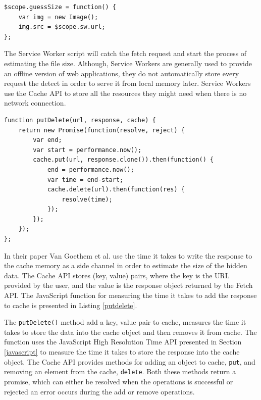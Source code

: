 \documentclass[10pt,a4paper,twoside]{book}
\begin{document}

\begin{lstlisting}[caption={Loading file as an Image},label={SWimg}]
$scope.guessSize = function() {
	var img = new Image();
	img.src = $scope.sw.url;
};
\end{lstlisting}

The Service Worker script will catch the fetch request and start the process of estimating the file size. Although, Service Workers are generally used to provide an offline version of web applications, they do not automatically store every request the detect in order to serve it from local memory later. Service Workers use the Cache API \cite{cacheAPI} to store all the resources they might need when there is no network connection.

\begin{lstlisting}[caption={JavaScript code for measuring the time it takes to write to cache.},label={putdelete}]
function putDelete(url, response, cache) {
    return new Promise(function(resolve, reject) {
        var end;
        var start = performance.now();
        cache.put(url, response.clone()).then(function() {
            end = performance.now();
            var time = end-start;
            cache.delete(url).then(function(res) {
                resolve(time);
            });
        });
    });
};
\end{lstlisting}

In their paper Van Goethem et al. \cite{van2015clock} use the time it takes to write the response to the cache memory as a side channel in order to estimate the size of the hidden data. The Cache API stores (key, value) pairs, where the key is the URL provided by the user, and the value is the response object returned by the Fetch API. The JavaScript function for measuring the time it takes to add the response to cache is presented in Listing \ref{putdelete}. 

The \texttt{putDelete()} method add a key, value pair to cache, measures the time it takes to store the data into the cache object and then removes it from cache. The function uses the JavaScript High Resolution Time API presented in Section \ref{javascript} to measure the time it takes to store the response into the cache object. The Cache API provides methods for adding an object to cache, \texttt{put}, and removing an element from the cache, \texttt{delete}. Both these methods return a promise, which can either be resolved when the operations is successful or rejected an error occurs during the add or remove operations.  
\end{document}
